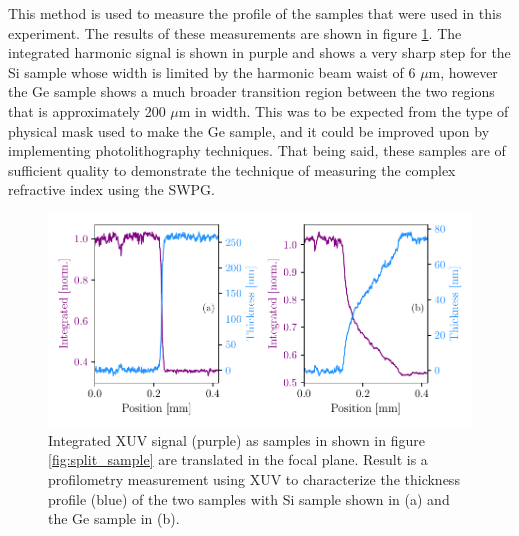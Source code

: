 This method is used to measure the profile of the samples that were used in this experiment.  The results of these measurements are shown in figure \ref{fig:knife_edge_samples}.  The integrated harmonic signal is shown in purple and shows a very sharp step for the Si sample whose width is limited by the harmonic beam waist of 6 $\mu$m, however the Ge sample shows a much broader transition region between the two regions that is approximately 200 $\mu$m in width.  This was to be expected from the type of physical mask used to make the Ge sample, and it could be improved upon by implementing photolithography techniques.  That being said, these samples are of sufficient quality to demonstrate the technique of measuring the complex refractive index using the SWPG.
\begin{figure}
	\centering
	\includegraphics[width=1.0\textwidth]{figures/refractive_index/integrated_knife_edge.pdf}
	\caption[Profilometry using integrated XUV signal for both Si and Ge samples]{Integrated XUV signal (purple) as samples in shown in figure \ref{fig:split_sample} are translated in the focal plane.  Result is a profilometry measurement using XUV to characterize the thickness profile (blue) of the two samples with Si sample shown in (a) and the Ge sample in (b).}
	\label{fig:knife_edge_samples}
\end{figure}

